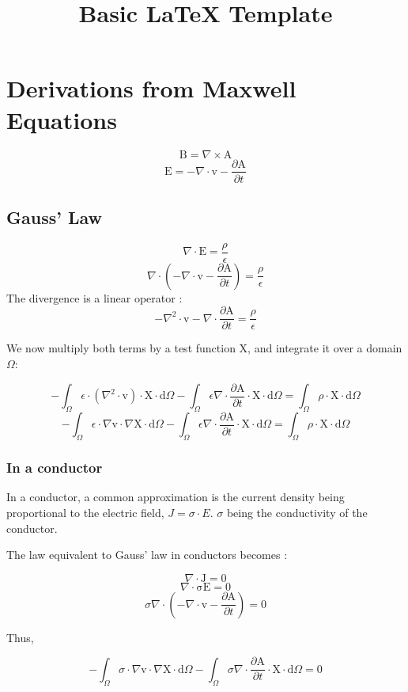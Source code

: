 \documentclass[10pt]{article}         %
\title{Basic \LaTeX{} Template}
\author{}
\begin{document}
%
\section{ Derivations from Maxwell Equations }
\[ \mathrm{B}  = \nabla \times \mathrm{A}\]
\[ \mathrm{E}  = - \nabla \cdot \mathrm{v}  - \frac{\partial  \mathrm{A}  }{ \partial t }\]
\subsection{Gauss' Law}
\[ \nabla \cdot \mathrm{E} = \frac{\rho}{\epsilon} \]
\[ \nabla \cdot \left( - \nabla \cdot \mathrm{v}  - \frac{\partial  \mathrm{A}  }{ \partial t } \right) = \frac{\rho}{\epsilon} \]
The divergence is a linear operator :
\[ - \nabla ^2  \cdot \mathrm{v} - \nabla \cdot \frac{\partial  \mathrm{A}  }{ \partial t }  = \frac{\rho}{\epsilon} \]

We now multiply both terms by a test function $\mathrm{X}$, and integrate it over a domain $\Omega$:

\[ -\int_{\Omega} \epsilon \cdot \left( \nabla ^2 \cdot \mathrm{v} \right) \cdot \mathrm{X} \cdot \mathrm{d}\Omega - \int_{\Omega} \epsilon \nabla \cdot \frac{\partial  \mathrm{A}  }{ \partial t } \cdot \mathrm{X} \cdot  \mathrm{d}\Omega  = \int_{\Omega} \rho \cdot \mathrm{X} \cdot \mathrm{d} \Omega  \]
\[ -\int_{\Omega} \epsilon \cdot \nabla  \mathrm{v}  \cdot \nabla \mathrm{X} \cdot \mathrm{d}\Omega  - \int_{\Omega} \epsilon  \nabla \cdot \frac{\partial  \mathrm{A}  }{ \partial t } \cdot \mathrm{X} \cdot  \mathrm{d}\Omega = \int_{\Omega} \rho \cdot \mathrm{X} \cdot \mathrm{d} \Omega  \]


\subsubsection{ In a conductor }
In a conductor, a common approximation is the current density being proportional to the electric field, $ J = \sigma \cdot E $. $\sigma$ being the conductivity of the conductor.

The law equivalent to Gauss' law in conductors becomes :

\[ \nabla \cdot \mathrm{J} = 0 \]
\[ \nabla \cdot \mathrm{ \sigma E } = 0 \]
\[  \sigma \nabla \cdot \left( - \nabla \cdot \mathrm{v}  - \frac{\partial  \mathrm{A}  }{ \partial t } \right)  = 0 \]

Thus,

\[ -\int_{\Omega} \sigma \cdot \nabla  \mathrm{v}  \cdot \nabla \mathrm{X} \cdot \mathrm{d}\Omega  - \int_{\Omega} \sigma  \nabla \cdot \frac{\partial  \mathrm{A}  }{ \partial t } \cdot \mathrm{X} \cdot  \mathrm{d}\Omega = 0  \]
\end{document}
